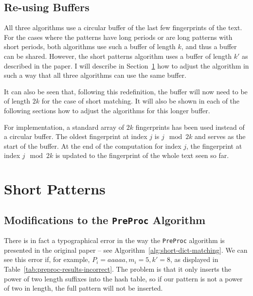 \documentclass[ %
                    author={Dominic Joseph Moylett},
                    degree={MEng},
                     title={Dictionary Matching with Fingerprints},
                  subtitle={An Empirical Analysis},
                      type={research},
                      year={2015} ]{dissertation}
\begin{document}
\subsection{Re-using Buffers}

All three algorithms use a circular buffer of the last few fingerprints of the text. For the cases where the patterns have long periods or are long patterns with short periods, both algorithms use such a buffer of length $k$, and thus a buffer can be shared. However, the short patterns algorithm uses a buffer of length $k'$ as described in the paper. I will describe in Section~\ref{sec:impl-short} how to adjust the algorithm in such a way that all three algorithms can use the same buffer.

It can also be seen that, following this redefinition, the buffer will now need to be of length $2k$ for the case of short matching. It will also be shown in each of the following sections how to adjust the algorithms for this longer buffer.

For implementation, a standard array of $2k$ fingerprints has been used instead of a circular buffer. The oldest fingerprint at index $j$ is $j \mod 2k$ and serves as the start of the buffer. At the end of the computation for index $j$, the fingerprint at index $j \mod 2k$ is updated to the fingerprint of the whole text seen so far.

\section{Short Patterns}
\label{sec:impl-short}

\subsection{Modifications to the \texttt{PreProc} Algorithm}

There is in fact a typographical error in the way the \texttt{PreProc} algorithm is presented in the original paper -- see Algorithm~\ref{alg:short-dict-matching}. We can see this error if, for example, $P_i = aaaaa, m_i = 5, k' = 8$, as displayed in Table~\ref{tab:preproc-results-incorrect}. The problem is that it only inserts the power of two length suffixes into the hash table, so if our pattern is not a power of two in length, the full pattern will not be inserted.
\end{document}
